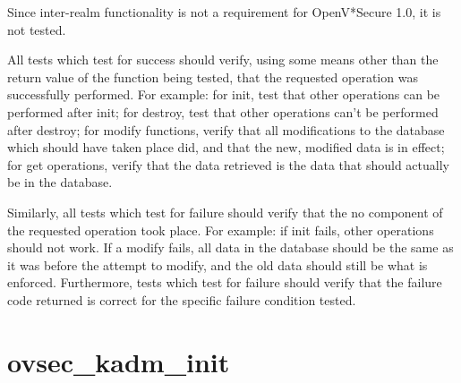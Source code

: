 Since inter-realm functionality is not a requirement for OpenV*Secure
1.0, it is not tested.


All tests which test for success should verify, using some means other
than the return value of the function being tested, that the requested
operation was successfully performed.  For example: for init, test
that other operations can be performed after init; for destroy, test
that other operations can't be performed after destroy; for modify
functions, verify that all modifications to the database which should
have taken place did, and that the new, modified data is in effect;
for get operations, verify that the data retrieved is the data that
should actually be in the database.

Similarly, all tests which test for failure should verify that the
no component of the requested operation took place.  For example: if
init fails, other operations should not work.  If a modify fails, all
data in the database should be the same as it was before the attempt
to modify, and the old data should still be what is enforced.
Furthermore, tests which test for failure should verify that the
failure code returned is correct for the specific failure condition
tested.

\section{ovsec_kadm_init}




